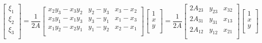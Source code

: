 \begin{equation}
\begin{bmatrix}
\xi_1 \\
\xi_2 \\
\xi_3 \\
\end{bmatrix}
= 
\frac{1}{2A}\begin{bmatrix}
x_2y_3-x_3y_2&y_2-y_3&x_3-x_2 \\
x_3y_1-x_1y_3&y_3-y_1&x_1-x_3 \\
x_1y_2-x_2y_1&y_1-y_2&x_2-x_1 \\
\end{bmatrix}
\begin{bmatrix}
1\\
x \\
y \\
\end{bmatrix}
= 
\frac{1}{2A}\begin{bmatrix}
2A_{23}&y_{23}&x_{32} \\
2A_{31}&y_{31}&x_{13} \\
2A_{12}&y_{12}&x_{21} \\
\end{bmatrix}
\begin{bmatrix}
1 \\
x \\
y \\

\end{bmatrix}
\end{equation}

